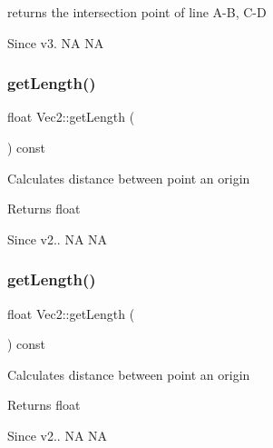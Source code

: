 returns the intersection point of line A-\/B, C-\/D \begin{DoxySince}{Since}
v3.  NA  NA 
\end{DoxySince}
\mbox{\label{classVec2_ae486d0799b31a9831eef5a35164a4846}} 
\subsubsection{\texorpdfstring{get\+Length()}{getLength()}\hspace{0.1cm}{\footnotesize\ttfamily [1/2]}}
{\footnotesize\ttfamily float Vec2\+::get\+Length (\begin{DoxyParamCaption}{ }\end{DoxyParamCaption}) const\hspace{0.3cm}{\ttfamily [inline]}}

Calculates distance between point an origin \begin{DoxyReturn}{Returns}
float 
\end{DoxyReturn}
\begin{DoxySince}{Since}
v2..  NA  NA 
\end{DoxySince}
\mbox{\label{classVec2_ae486d0799b31a9831eef5a35164a4846}} 
\subsubsection{\texorpdfstring{get\+Length()}{getLength()}\hspace{0.1cm}{\footnotesize\ttfamily [2/2]}}
{\footnotesize\ttfamily float Vec2\+::get\+Length (\begin{DoxyParamCaption}{ }\end{DoxyParamCaption}) const\hspace{0.3cm}{\ttfamily [inline]}}

Calculates distance between point an origin \begin{DoxyReturn}{Returns}
float 
\end{DoxyReturn}
\begin{DoxySince}{Since}
v2..  NA  NA 
\end{DoxySince}
\mbox{\label{classVec2_a0b3f546ad8db551b9428d147318aee34}} 
